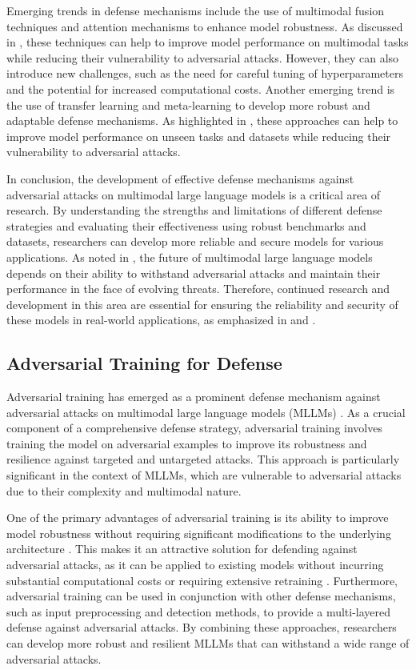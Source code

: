 \documentclass[11pt,a4paper]{article}
\begin{document}
Emerging trends in defense mechanisms include the use of multimodal fusion techniques and attention mechanisms to enhance model robustness. As discussed in \cite{doi:10.1109/bigdata59044.2023.10386743}, these techniques can help to improve model performance on multimodal tasks while reducing their vulnerability to adversarial attacks. However, they can also introduce new challenges, such as the need for careful tuning of hyperparameters and the potential for increased computational costs. Another emerging trend is the use of transfer learning and meta-learning to develop more robust and adaptable defense mechanisms. As highlighted in \cite{arxiv:2401.13601}, these approaches can help to improve model performance on unseen tasks and datasets while reducing their vulnerability to adversarial attacks.

In conclusion, the development of effective defense mechanisms against adversarial attacks on multimodal large language models is a critical area of research. By understanding the strengths and limitations of different defense strategies and evaluating their effectiveness using robust benchmarks and datasets, researchers can develop more reliable and secure models for various applications. As noted in \cite{arxiv:2601.03594}, the future of multimodal large language models depends on their ability to withstand adversarial attacks and maintain their performance in the face of evolving threats. Therefore, continued research and development in this area are essential for ensuring the reliability and security of these models in real-world applications, as emphasized in \cite{doi:10.1145/3764113} and \cite{arxiv:2409.18142}.


\subsection{Adversarial Training for Defense}


Adversarial training has emerged as a prominent defense mechanism against adversarial attacks on multimodal large language models (MLLMs) \cite{arxiv:2401.13601}. As a crucial component of a comprehensive defense strategy, adversarial training involves training the model on adversarial examples to improve its robustness and resilience against targeted and untargeted attacks. This approach is particularly significant in the context of MLLMs, which are vulnerable to adversarial attacks due to their complexity and multimodal nature.

One of the primary advantages of adversarial training is its ability to improve model robustness without requiring significant modifications to the underlying architecture \cite{doi:10.18653/v1/2023.acl-long.411}. This makes it an attractive solution for defending against adversarial attacks, as it can be applied to existing models without incurring substantial computational costs or requiring extensive retraining \cite{arxiv:2402.11530}. Furthermore, adversarial training can be used in conjunction with other defense mechanisms, such as input preprocessing and detection methods, to provide a multi-layered defense against adversarial attacks. By combining these approaches, researchers can develop more robust and resilient MLLMs that can withstand a wide range of adversarial attacks.
\end{document}
